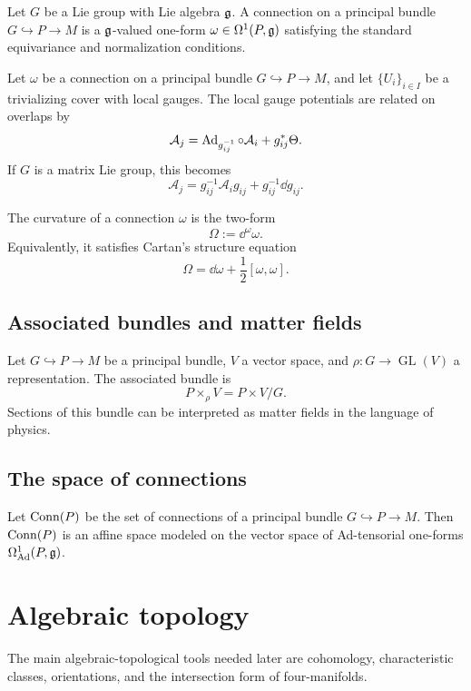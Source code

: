 \begin{definition}
Let $G$ be a Lie group with Lie algebra $\mathfrak{g}$. A connection on a principal bundle $G\hookrightarrow P\to M$ is a $\mathfrak{g}$-valued one-form $\omega\in\Omega^1(P,\mathfrak{g})$ satisfying the standard equivariance and normalization conditions.
\end{definition}

\begin{proposition}
Let $\omega$ be a connection on a principal bundle $G\hookrightarrow P\to M$, and let $\{U_i\}_{i\in I}$ be a trivializing cover with local gauges. The local gauge potentials are related on overlaps by
\[
  \mathcal{A}_j = \operatorname{Ad}_{g_{ij}^{-1}}\circ \mathcal{A}_i + g_{ij}^{*}\Theta.
\]
If $G$ is a matrix Lie group, this becomes
\[
  \mathcal{A}_j = g_{ij}^{-1}\mathcal{A}_i g_{ij}+g_{ij}^{-1}\dd g_{ij}.
\]
\end{proposition}

\begin{definition}[Curvature]
The curvature of a connection $\omega$ is the two-form
\[
  \Omega := \dd^\omega \omega.
\]
Equivalently, it satisfies Cartan's structure equation
\[
  \Omega = \dd\omega + \frac12[\omega,\omega].
\]
\end{definition}
\subsection{Associated bundles and matter fields}
Let $G\hookrightarrow P\to M$ be a principal bundle, $V$ a vector space, and $\rho\colon G\to \operatorname{GL}(V)$ a representation. The associated bundle is
\[
  P\times_\rho V = P\times V/G.
\]
Sections of this bundle can be interpreted as matter fields in the language of physics.

\subsection{The space of connections}

\begin{proposition}
Let $\operatorname{Conn}(P)$ be the set of connections of a principal bundle $G\hookrightarrow P\to M$. Then $\operatorname{Conn}(P)$ is an affine space modeled on the vector space of Ad-tensorial one-forms $\Omega^1_{\operatorname{Ad}}(P,\mathfrak{g})$.
\end{proposition}

\section{Algebraic topology}
The main algebraic-topological tools needed later are cohomology, characteristic classes, orientations, and the intersection form of four-manifolds.

